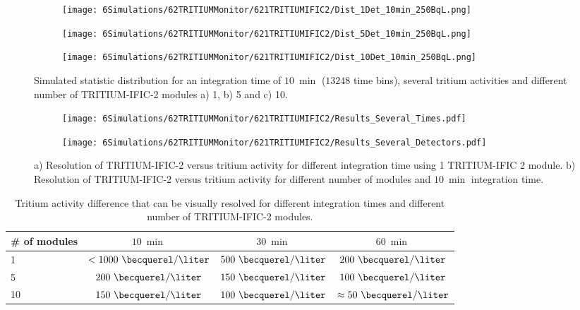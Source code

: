 \begin{figure}
\centering
    \begin{subfigure}[b]{0.6\textwidth}
    \centering
    \texttt{[image: 6Simulations/62TRITIUMMonitor/621TRITIUMIFIC2/Dist\_1Det\_10min\_250BqL.png]}  
    \caption{\label{subfig:1Det10min250BqLSD}}
    \end{subfigure}
    \hfill
    \begin{subfigure}[b]{0.6\textwidth}
    \centering
    \texttt{[image: 6Simulations/62TRITIUMMonitor/621TRITIUMIFIC2/Dist\_5Det\_10min\_250BqL.png]}  
    \caption{\label{subfig:5Det10min250BqLSD}}
    \end{subfigure}
    \hfill
    \begin{subfigure}[b]{0.6\textwidth}
    \centering
    \texttt{[image: 6Simulations/62TRITIUMMonitor/621TRITIUMIFIC2/Dist\_10Det\_10min\_250BqL.png]}  
    \caption{\label{subfig:10Det10min250BqLSD}}
    \end{subfigure}
 \caption{Simulated statistic distribution for an integration time of $10~\min$ ($13248$ time bins), several tritium activities and different number of TRITIUM-IFIC-2 modules a) 1, b) 5 and c) 10.}
 \label{fig:SeveralDet250BqL10min}
\end{figure}

\begin{figure}
\centering
    \begin{subfigure}[b]{0.75\textwidth}
    \centering
    \texttt{[image: 6Simulations/62TRITIUMMonitor/621TRITIUMIFIC2/Results\_Several\_Times.pdf]}  
    \caption{\label{subfig:ResolutionvsIntegrationCoutingTime}}
    \end{subfigure}
    \hfill
    \begin{subfigure}[b]{0.75\textwidth}
    \centering
    \texttt{[image: 6Simulations/62TRITIUMMonitor/621TRITIUMIFIC2/Results\_Several\_Detectors.pdf]}  
    \caption{\label{subfig:ResolutionvsNumberDetectors}}
    \end{subfigure}
 \caption{a) Resolution of TRITIUM-IFIC-2 versus tritium activity for different integration time using 1 TRITIUM-IFIC 2 module. b) Resolution of TRITIUM-IFIC-2 versus tritium activity for different number of modules and $10~\min$ integration time.}
 \label{fig:Resolution}
\end{figure}

\begin{table}[htbp]
\centering{}%
\begin{tabular}{lccc}
\toprule 
\# of modules & $10~\min$ & $30~\min$ & $60~\min$ \tabularnewline
\midrule
\midrule 
1 & $<1000~\becquerel/\liter$ & $500~\becquerel/\liter$ & $200~\becquerel/\liter$ \tabularnewline
5 & $200~\becquerel/\liter$ & $150~\becquerel/\liter$ & $100~\becquerel/\liter$ \tabularnewline
10 & $150~\becquerel/\liter$ & $100~\becquerel/\liter$ & $\approx 50~\becquerel/\liter$ \tabularnewline
\bottomrule
\end{tabular}
\caption{Tritium activity difference that can be visually resolved for different integration times and different number of TRITIUM-IFIC-2 modules.}
\label{tab:DifferentCasesOfTI2}
\end{table}

